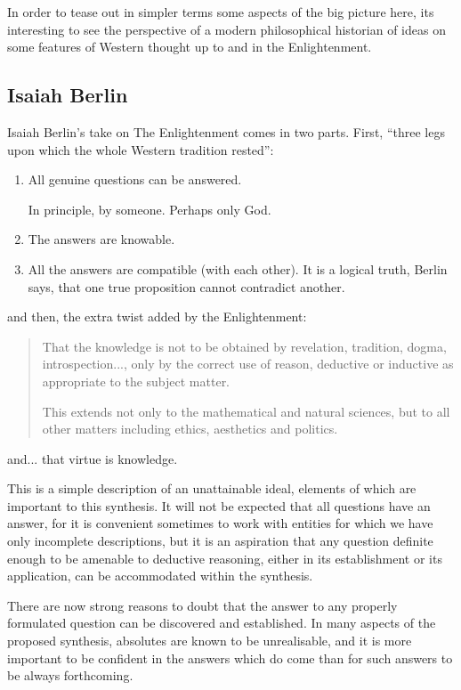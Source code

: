 \documentclass[10pt,titlepage]{book}
\begin{document}
In order to tease out in simpler terms some aspects of the big picture here, its interesting to see the perspective of a modern philosophical historian of ideas on some features of Western thought up to and in the Enlightenment.

\subsection{Isaiah Berlin}

Isaiah Berlin's take on The Enlightenment\cite{berlinRR} comes in two parts.
First, ``three legs upon which the whole Western tradition rested'':
\begin{enumerate}
  \item All genuine questions can be answered.

    In principle, by someone.  Perhaps only God.
\item  The answers are knowable.
\item All the answers are compatible (with each other).
  It is a logical truth, Berlin says, that one true proposition cannot contradict another.
\end{enumerate}

and then, the extra twist added by the Enlightenment:
\begin{quotation}
That the knowledge is not to be obtained by revelation, tradition, dogma, introspection..., only by the correct use of reason, deductive or inductive as appropriate to the subject matter.

This extends not only to the mathematical and natural sciences, but to all other matters including ethics, aesthetics and politics.
\end{quotation}
and... that virtue is knowledge.

This is a simple description of an unattainable ideal, elements of which are important to this synthesis.
It will not be expected that all questions have an answer, for it is convenient sometimes to work with entities for which we have only incomplete descriptions, but it is an aspiration that any question definite enough to be amenable to deductive reasoning, either in its establishment or its application, can be accommodated within the synthesis.

There are now strong reasons to doubt that the answer to any properly formulated question can be discovered and established.
In many aspects of the proposed synthesis, absolutes are known to be unrealisable, and it is more important to be confident in the answers which do come than for such answers to be always forthcoming.
\end{document}
